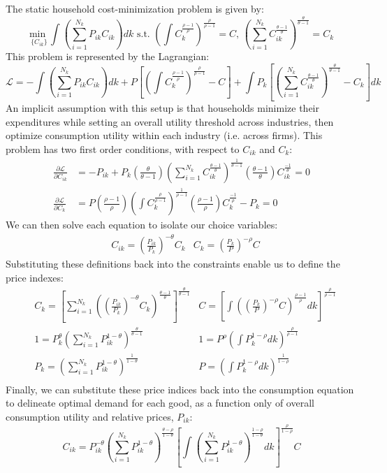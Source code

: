 \documentclass{article}
\newcommand{\usmin}[1]{\underset{#1}{\text{min }}}
\renewcommand{\L}{\mathcal{L}}
\newcommand{\sumnk}{\sum_{i=1}^{N_k}}
\begin{document}
The static household cost-minimization problem is given by:
\[
	\usmin{\{C_{ik}\}} \int\left(\sumnk P_{ik}C_{ik}\right) dk 
		\text{ s.t. } 	
		\left(\int C_k^{\frac{\rho-1}{\rho}}\right)^{\frac{\rho}{\rho-1}} = C \text{, }
		\left(\sumnk C_{ik}^{\frac{\theta-1}{\theta}}\right)^{\frac{\theta}{\theta-1}} = C_k
\]
This problem is represented by the Lagrangian:
{\small 
	\[
		\L = -\int\left(\sumnk P_{ik}C_{ik}\right) dk 
				+ P\left[\left(\int C_k^{\frac{\rho-1}{\rho}}\right)^{\frac{\rho}{\rho-1}}-C\right] + \int P_k\left[\left(\sumnk C_{ik}^{\frac{\theta-1}{\theta}}\right)^{\frac{\theta}{\theta-1}} - C_k\right]dk
	\]
}
An implicit assumption with this setup is that households minimize their expenditures while setting an overall utility threshold across industries, then optimize consumption utility within each industry (i.e. across firms). This problem has two first order conditions, with respect to $C_{ik}$ and $C_k$:
\begin{align*}
	\frac{\partial\L}{\partial C_{ik}} 	&= -P_{ik} + P_k\left(\frac{\theta}{\theta-1}\right) 
		\left(\sumnk C_{ik}^{\frac{\theta-1}{\theta}}\right)^{\frac{1}{\theta-1}}\left(\frac{\theta-1}{\theta}\right)C_{ik}^{\frac{-1}{\theta}} = 0	\\
	\frac{\partial\L}{\partial C_k} 	&= P\left(\frac{\rho-1}{\rho}\right)
		\left(\int C_k^{\frac{\rho}{\rho-1}}\right)^{\frac{1}{\rho-1}}\left(\frac{\rho-1}{\rho}\right)C_k^{\frac{-1}{\rho}} - P_k = 0
\end{align*}
We can then solve each equation to isolate our choice variables:
\begin{align*}
	&C_{ik} 	= \left(\frac{P_{ik}}{P_k}\right)^{-\theta}C_k
	&C_k		= \left(\frac{P_k}{P}\right)^{-\rho}C
\end{align*}
Substituting these definitions back into the constraints enable us to define the price indexes:
\begin{align*}
	&C_k	= \left[\sumnk \left(\left(\frac{P_{ik}}{P_k}\right)^{-\theta}C_k\right)^{\frac{\theta-1}{\theta}}\right]^{\frac{\theta}{\theta-1}}	
		&C	= \left[\int \left(\left(\frac{P_k}{P}\right)^{-\rho}C\right)^{\frac{\rho-1}{\rho}}dk\right]^{\frac{\rho}{\rho-1}}	\\
	&1		= P_k^\theta\left(\sumnk P_{ik}^{1-\theta}\right)^{\frac{\theta}{\theta-1}}	
		&1	= P^\rho\left(\int P_k^{1-\rho}dk\right)^{\frac{\rho}{\rho-1}}	\\
	&P_k 	= \left(\sumnk P_{ik}^{1-\theta}\right)^{\frac{1}{1-\theta}}
		&P	= \left(\int P_k^{1-\rho}dk\right)^{\frac{1}{1-\rho}}			\\
\end{align*}
Finally, we can substitute these price indices back into the consumption equation to delineate optimal demand for each good, as a function only of overall consumption utility and relative prices, $P_{ik}$:
\[
	C_{ik} 	= P_{ik}^{-\theta}
				\left(\sumnk P_{ik}^{1-\theta}\right)^{\frac{\theta-\rho}{1-\theta}}
				\left[\int \left(\sumnk P_{ik}^{1-\theta}\right)^{\frac{1-\rho}{1-\theta}}dk\right]^{\frac{\rho}{1-\rho}}C
\]
\end{document}
